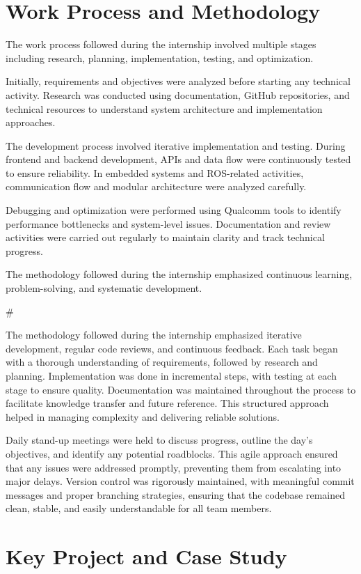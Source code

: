 \documentclass[12pt,a4paper]{report}
\begin{document}
\section{Work Process and Methodology}

The work process followed during the internship involved multiple stages including research, planning, implementation, testing, and optimization.


Initially, requirements and objectives were analyzed before starting any technical activity. Research was conducted using documentation, GitHub repositories, and technical resources to understand system architecture and implementation approaches.


The development process involved iterative implementation and testing. During frontend and backend development, APIs and data flow were continuously tested to ensure reliability. In embedded systems and ROS-related activities, communication flow and modular architecture were analyzed carefully.


Debugging and optimization were performed using Qualcomm tools to identify performance bottlenecks and system-level issues. Documentation and review activities were carried out regularly to maintain clarity and track technical progress.


The methodology followed during the internship emphasized continuous learning, problem-solving, and systematic development.


\#


The methodology followed during the internship emphasized iterative development, regular code reviews, and continuous feedback. Each task began with a thorough understanding of requirements, followed by research and planning. Implementation was done in incremental steps, with testing at each stage to ensure quality. Documentation was maintained throughout the process to facilitate knowledge transfer and future reference. This structured approach helped in managing complexity and delivering reliable solutions.


Daily stand-up meetings were held to discuss progress, outline the day's objectives, and identify any potential roadblocks. This agile approach ensured that any issues were addressed promptly, preventing them from escalating into major delays. Version control was rigorously maintained, with meaningful commit messages and proper branching strategies, ensuring that the codebase remained clean, stable, and easily understandable for all team members.


\section{Key Project and Case Study}
\end{document}

